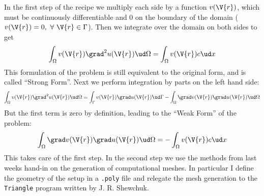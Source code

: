 \documentclass[sigconf]{acmart}
\begin{document}
In the first step of the recipe we multiply each side by a function $ v(\V{r}) $, which must be continuously differentiable and 0 on the boundary of the domain ($ v(\V{r})=0,\ \forall \ \V{r}\in \Gamma $). Then we integrate over the domain on both sides to get
\begin{equation}\label{key}
	\int_{\Omega} v(\V{r}) \grad^2 u(\V{r}) \ud \Omega = \int_{\Omega} v(\V{r}) c \ud x
\end{equation}
This formulation of the problem is still equivalent to the original form, and is called ``Strong Form''. Next we perform integration by parts on the left hand side:
\begin{equation}\label{key}
	\int_{\Omega} v(\V{r}) \grad^2 u(\V{r}) \ud \Omega = \int_{\Gamma} v(\V{r}) \grad u(\V{r}) \ud \Gamma - \int_{\Omega} \grad v(\V{r}) \grad u(\V{r}) \ud \Omega
\end{equation}
But the first term is zero by definition, leading to the ``Weak Form'' of the problem:
\begin{equation}\label{key}
\int_{\Omega} \grad v(\V{r}) \grad u(\V{r}) \ud \Omega =- \int_{\Omega} v(\V{r}) c \ud x
\end{equation}
This takes care of the first step. In the second step we use the methods from last weeks hand-in on the generation of computational meshes. In particular I define the geometry of the setup in a \texttt{.poly} file and relegate the mesh generation to the \texttt{Triangle} program written by J. R. Shewchuk.
\end{document}
